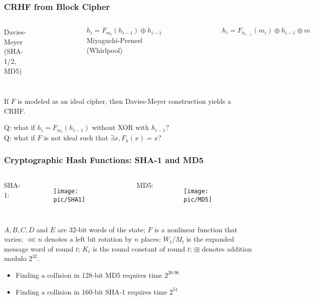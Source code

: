 \begin{frame}\frametitle{CRHF from Block Cipher}
\begin{columns}
Davies-Meyer (SHA-1/2, MD5)
\begin{figure}
\begin{center}

\end{center}
\end{figure}
$h_{i} = F_{m_{i}}(h_{i-1}) \oplus h_{i-1}$
Miyaguchi-Preneel (Whirlpool)
\begin{figure}
\begin{center}

\end{center}
\end{figure}
$h_{i} = F_{h_{i-1}}(m_{i}) \oplus h_{i-1} \oplus m$
\end{columns}
$\quad$\\
\begin{theorem}
If $F$ is modeled as an ideal cipher, then Davies-Meyer construction yields a CRHF.
\end{theorem}
\alert{Q: what if $h_{i} = F_{m_{i}}(h_{i-1})$ without XOR with $h_{i-1}$? }\\
\alert{Q: what if $F$ is not ideal such that $\exists x, F_k(x)=x$?}
\end{frame}
\begin{frame}\frametitle{Cryptographic Hash Functions: SHA-1 and MD5}
\begin{columns}[c]
SHA-1:
\begin{figure}
\begin{center}
\texttt{[image: pic/SHA1]}
\end{center}
\end{figure}
MD5:
\begin{figure}
\begin{center}
\texttt{[image: pic/MD5]}
\end{center}
\end{figure}
\end{columns}
$A, B, C, D$ and $E$ are 32-bit words of the state;
$F$ is a nonlinear function that varies;
$\lll n$ denotes a left bit rotation by $n$ places;
$W_t$/$M_t$ is the expanded message word of round $t$;
$K_t$ is the round constant of round $t$;
$\boxplus$ denotes addition modulo $2^{32}$.
\begin{itemize}
\item Finding a collision in 128-bit MD5 requires time $2^{20.96}$
\item Finding a collision in 160-bit SHA-1 requires time $2^{51}$
\end{itemize}
\end{frame}
